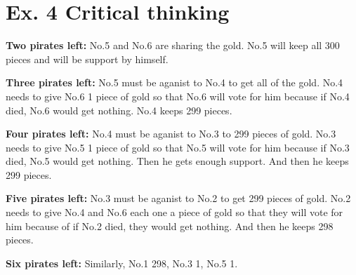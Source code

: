 \documentclass[a4paper]{article}
\begin{document}
\section*{Ex. 4 Critical thinking}
	\textbf{Two pirates left:} No.5 and No.6 are sharing the gold. No.5 will keep all 300 pieces and will be support by himself.\par
	\textbf{Three pirates left:} No.5 must be aganist to No.4 to get all of the gold. No.4 needs to give No.6 1 piece of gold so that No.6 will vote for him because if No.4 died, No.6 would get nothing. No.4 keeps 299 pieces.\par
	\textbf{Four pirates left:} No.4 must be aganist to No.3 to 299 pieces of gold. No.3 needs to give No.5 1 piece of gold so that No.5 will vote for him because if No.3 died, No.5 would get nothing. Then he gets enough support. And then he keeps 299 pieces.\par
	\textbf{Five pirates left:} No.3 must be aganist to No.2 to get 299 pieces of gold. No.2 needs to give No.4 and No.6 each one a piece of gold so that they will vote for him because of if No.2 died, they would get nothing. And then he keeps 298 pieces.\par
	\textbf{Six pirates left:} Similarly, No.1 298, No.3 1, No.5 1.
\end{document}
